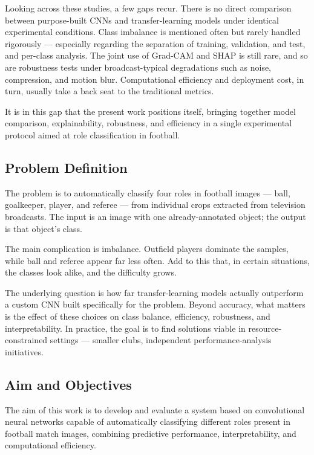 \documentclass[preprint,12pt]{elsarticle}
\begin{document}
Looking across these studies, a few gaps recur. There is no direct comparison between purpose-built CNNs and transfer-learning models under identical experimental conditions. Class imbalance is mentioned often but rarely handled rigorously --- especially regarding the separation of training, validation, and test, and per-class analysis. The joint use of Grad-CAM and SHAP is still rare, and so are robustness tests under broadcast-typical degradations such as noise, compression, and motion blur. Computational efficiency and deployment cost, in turn, usually take a back seat to the traditional metrics.

It is in this gap that the present work positions itself, bringing together model comparison, explainability, robustness, and efficiency in a single experimental protocol aimed at role classification in football.

\subsection{Problem Definition}
The problem is to automatically classify four roles in football images --- ball, goalkeeper, player, and referee --- from individual crops extracted from television broadcasts. The input is an image with one already-annotated object; the output is that object's class.

The main complication is imbalance. Outfield players dominate the samples, while ball and referee appear far less often. Add to this that, in certain situations, the classes look alike, and the difficulty grows.

The underlying question is how far transfer-learning models actually outperform a custom CNN built specifically for the problem. Beyond accuracy, what matters is the effect of these choices on class balance, efficiency, robustness, and interpretability. In practice, the goal is to find solutions viable in resource-constrained settings --- smaller clubs, independent performance-analysis initiatives.

\subsection{Aim and Objectives}
The aim of this work is to develop and evaluate a system based on convolutional neural networks capable of automatically classifying different roles present in football match images, combining predictive performance, interpretability, and computational efficiency.
\end{document}
